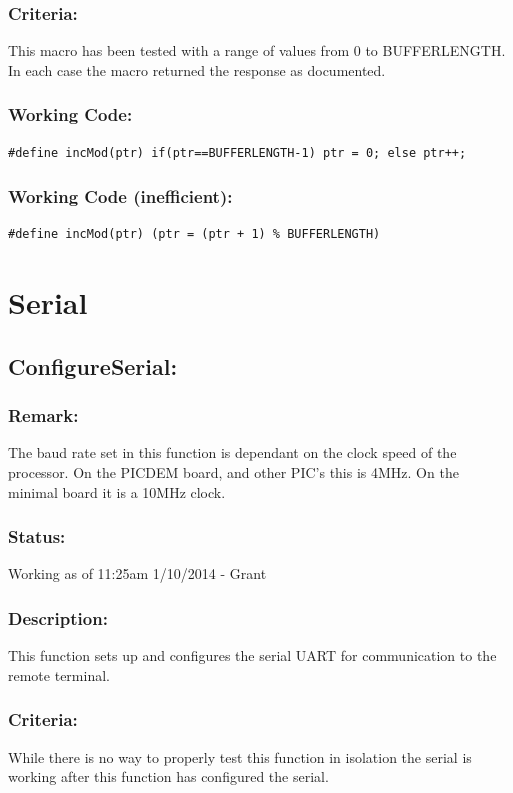 \documentclass[]{report}
\begin{document}
\subsubsection{Criteria:}
This macro has been tested with a range of values from 0 to BUFFERLENGTH. In each case the macro returned the response as documented.

\subsubsection{Working Code:}
\begin{lstlisting}
#define incMod(ptr) if(ptr==BUFFERLENGTH-1) ptr = 0; else ptr++;
\end{lstlisting}

\subsubsection{Working Code (inefficient):}
\begin{lstlisting}
#define incMod(ptr) (ptr = (ptr + 1) % BUFFERLENGTH)
\end{lstlisting}

\newpage
\section{Serial}

\subsection{ConfigureSerial:}
\subsubsection{Remark:}
The baud rate set in this function is dependant on the clock speed of the processor. On the PICDEM board, and other PIC's this is 4MHz. On the minimal board it is a 10MHz clock.

\subsubsection{Status:}
Working as of 11:25am 1/10/2014 - Grant

\subsubsection{Description:}
This function sets up and configures the serial UART for communication to the remote terminal.

\subsubsection{Criteria:}
While there is no way to properly test this function in isolation the serial is working after this function has configured the serial.
\end{document}
